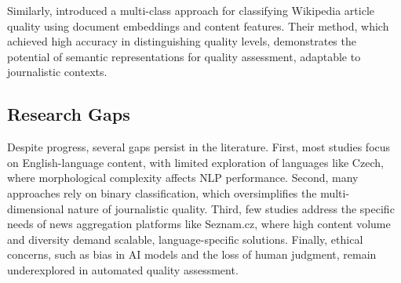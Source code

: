 Similarly, \cite{schmidt2019} introduced a multi-class approach for classifying Wikipedia article quality using document embeddings and content features. Their method, which achieved high accuracy in distinguishing quality levels, demonstrates the potential of semantic representations for quality assessment, adaptable to journalistic contexts.





\subsection{Research Gaps}
Despite progress, several gaps persist in the literature. First, most studies focus on English-language content, with limited exploration of languages like Czech, where morphological complexity affects \ac{NLP} performance. Second, many approaches rely on binary classification, which oversimplifies the multi-dimensional nature of journalistic quality. Third, few studies address the specific needs of news aggregation platforms like Seznam.cz, where high content volume and diversity demand scalable, language-specific solutions. Finally, ethical concerns, such as bias in AI models and the loss of human judgment, remain underexplored in automated quality assessment.

